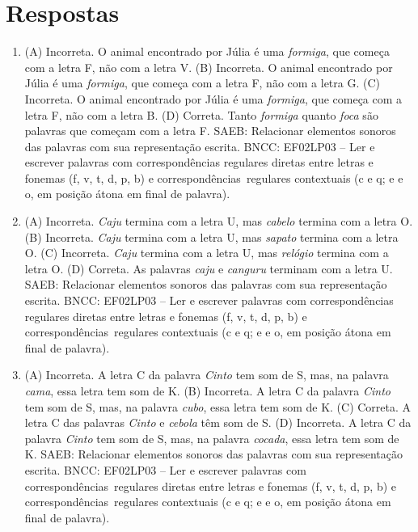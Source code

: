 \chapter{Respostas}
\pagestyle{plain}
\footnotesize

\pagecolor{gray!40}


\begin{enumerate}
\item
(A) Incorreta. O animal encontrado por Júlia é uma \textit{formiga}, 
que começa com a letra F, não com a letra V.
(B) Incorreta. O animal encontrado por Júlia é uma \textit{formiga}, 
que começa com a letra F, não com a letra G.
(C) Incorreta. O animal encontrado por Júlia é uma \textit{formiga}, 
que começa com a letra F, não com a letra B. 
(D) Correta. Tanto \textit{formiga} quanto \textit{foca} são palavras
que começam com a letra F.
SAEB: Relacionar elementos sonoros das palavras com sua
representação escrita.
BNCC: EF02LP03 -- Ler e escrever palavras com correspondências
regulares diretas entre letras e fonemas (f, v, t, d, p, b) e
correspondências~regulares contextuais (c e q; e e o, em posição átona
em final de palavra).

\item
(A) Incorreta. \textit{Caju} termina com a letra U, mas \textit{cabelo} termina com a letra O.
(B) Incorreta. \textit{Caju} termina com a letra U, mas \textit{sapato} termina com a letra O.
(C) Incorreta. \textit{Caju} termina com a letra U, mas \textit{relógio} termina com a letra O.
(D) Correta. As palavras \textit{caju} e \textit{canguru} terminam com a letra U.
SAEB: Relacionar elementos sonoros das palavras com sua
representação escrita.
BNCC: EF02LP03 -- Ler e escrever palavras com correspondências
regulares diretas entre letras e fonemas (f, v, t, d, p, b) e
correspondências~regulares contextuais (c e q; e e o, em posição átona
em final de palavra).

\item
(A) Incorreta. A letra C da palavra \textit{Cinto} tem som de S, mas,
na palavra \textit{cama}, essa letra tem som de K. 
(B) Incorreta. A letra C da palavra \textit{Cinto} tem som de S, mas,
na palavra \textit{cubo}, essa letra tem som de K.
(C) Correta. A letra C das palavras \textit{Cinto} e \textit{cebola}
têm som de S.
(D) Incorreta. A letra C da palavra \textit{Cinto} tem som de S, mas,
na palavra \textit{cocada}, essa letra tem som de K.
SAEB: Relacionar elementos sonoros das palavras com sua
representação escrita.
BNCC: EF02LP03 -- Ler e
escrever palavras com correspondências~regulares diretas entre letras e
fonemas (f, v, t, d, p, b) e correspondências~regulares contextuais (c e
q; e e o, em posição átona em final de palavra).
\end{enumerate}

